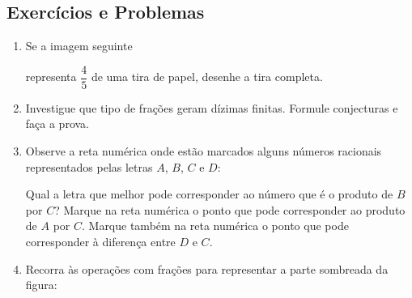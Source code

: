 \subsection{Exercícios e Problemas}
\begin{enumerate}
    \item Se a imagem seguinte  representa $\dfrac{4}{5}$ de uma tira de papel, desenhe a tira completa.
 
 \item Investigue que tipo de frações geram dízimas finitas. Formule conjecturas e faça a prova.
 
 \item Observe a reta numérica onde estão marcados alguns números racionais representados pelas letras $A$, $B$, $C$ e $D$:
 
 \vspace{1cm}
 \begin{minipage}[h]{8cm}
 
 
\end{minipage}
\vspace{1cm}

Qual a letra que melhor pode corresponder ao número que é o produto de $B$ por $C$? Marque na reta numérica o ponto que pode corresponder ao produto de $A$ por $C$. Marque também na reta numérica o ponto que pode corresponder à diferença entre $D$ e $C$.

\item Recorra às operações com frações para representar a parte sombreada da figura:

\begin{minipage}[h]{14cm}
\begin{center}
\end{center}
\end{minipage}
\end{enumerate}
